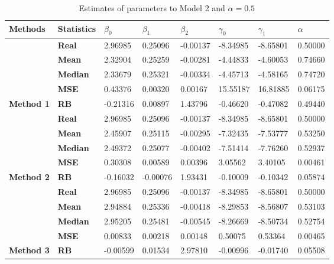 \begin{table}

\caption{\label{tab:Est_model_2_Alpha0.5}Estimates of parameters to Model 2 and $\alpha=0.5$}
\centering
\begin{tabular}[t]{>{}l>{}lllllll}
\toprule
Methods & Statistics & $\beta_0$ & $\beta_1$ & $\beta_2$ & $\gamma_0$ & $\gamma_1$ & $\alpha$\\
\midrule
 & \textbf{Real} & 2.96985 & 0.25096 & -0.00137 & -8.34985 & -8.65801 & 0.50000\\
\cmidrule{2-8}
 & \textbf{Mean} & 2.32904 & 0.25259 & -0.00281 & -4.44833 & -4.60053 & 0.74660\\
\cmidrule{2-8}
 & \textbf{Median} & 2.33679 & 0.25321 & -0.00334 & -4.45713 & -4.58165 & 0.74720\\
\cmidrule{2-8}
 & \textbf{MSE} & 0.43376 & 0.00320 & 0.00167 & 15.55187 & 16.81885 & 0.06175\\
\cmidrule{2-8}
\multirow{-5}{*}{\raggedright\arraybackslash \textbf{Method 1}} & \textbf{RB} & -0.21316 & 0.00897 & 1.43796 & -0.46620 & -0.47082 & 0.49440\\
\cmidrule{1-8}
 & \textbf{Real} & 2.96985 & 0.25096 & -0.00137 & -8.34985 & -8.65801 & 0.50000\\
\cmidrule{2-8}
 & \textbf{Mean} & 2.45907 & 0.25115 & -0.00295 & -7.32435 & -7.53777 & 0.53250\\
\cmidrule{2-8}
 & \textbf{Median} & 2.49372 & 0.25077 & -0.00402 & -7.51414 & -7.76260 & 0.52937\\
\cmidrule{2-8}
 & \textbf{MSE} & 0.30308 & 0.00589 & 0.00396 & 3.05562 & 3.40105 & 0.00461\\
\cmidrule{2-8}
\multirow{-5}{*}{\raggedright\arraybackslash \textbf{Method 2}} & \textbf{RB} & -0.16032 & -0.00076 & 1.93431 & -0.10009 & -0.10342 & 0.05874\\
\cmidrule{1-8}
 & \textbf{Real} & 2.96985 & 0.25096 & -0.00137 & -8.34985 & -8.65801 & 0.50000\\
\cmidrule{2-8}
 & \textbf{Mean} & 2.94884 & 0.25336 & -0.00418 & -8.29853 & -8.56807 & 0.53103\\
\cmidrule{2-8}
 & \textbf{Median} & 2.95205 & 0.25481 & -0.00545 & -8.26669 & -8.50734 & 0.52754\\
\cmidrule{2-8}
 & \textbf{MSE} & 0.00833 & 0.00218 & 0.00148 & 0.50075 & 0.53364 & 0.00465\\
\cmidrule{2-8}
\multirow{-5}{*}{\raggedright\arraybackslash \textbf{Method 3}} & \textbf{RB} & -0.00599 & 0.01534 & 2.97810 & -0.00996 & -0.01740 & 0.05508\\
\bottomrule
\end{tabular}
\end{table}
